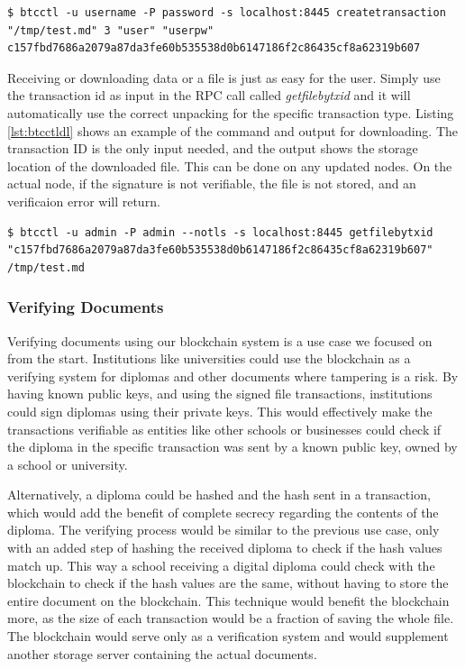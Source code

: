 \documentclass[12pt]{article}
\begin{document}
\begin{lstlisting}[float=h!,caption={Signed Transaction command example},label=lst:btcctls]
$ btcctl -u username -P password -s localhost:8445 createtransaction "/tmp/test.md" 3 "user" "userpw"
c157fbd7686a2079a87da3fe60b535538d0b6147186f2c86435cf8a62319b607
\end{lstlisting}

Receiving or downloading data or a file is just as easy for the user. Simply use the transaction id as input in the RPC call called \textit{getfilebytxid} and it will automatically use the correct unpacking for the specific transaction type. Listing \ref{lst:btcctldl} shows an example of the command and output for downloading. The transaction ID is the only input needed, and the output shows the storage location of the downloaded file. This can be done on any updated nodes. On the actual node, if the signature is not verifiable, the file is not stored, and an verificaion error will return.

\begin{lstlisting}[float=h!,caption={Transaction fetch example},label=lst:btcctldl]
$ btcctl -u admin -P admin --notls -s localhost:8445 getfilebytxid "c157fbd7686a2079a87da3fe60b535538d0b6147186f2c86435cf8a62319b607"
/tmp/test.md
\end{lstlisting}

\subsubsection{Verifying Documents}
Verifying documents using our blockchain system is a use case we focused on from the start. Institutions like universities could use the blockchain as a verifying system for diplomas and other documents where tampering is a risk. By having known public keys, and using the signed file transactions, institutions could sign diplomas using their private keys. This would effectively make the transactions verifiable as entities like other schools or businesses could check if the diploma in the specific transaction was sent by a known public key, owned by a school or university. 

Alternatively, a diploma could be hashed and the hash sent in a transaction, which would add the benefit of complete secrecy regarding the contents of the diploma. The verifying process would be similar to the previous use case, only with an added step of hashing the received diploma to check if the hash values match up. This way a school receiving a digital diploma could check with the blockchain to check if the hash values are the same, without having to store the entire document on the blockchain. This technique would benefit the blockchain more, as the size of each transaction would be a fraction of saving the whole file. The blockchain would serve only as a verification system and would supplement another storage server containing the actual documents. 
\end{document}
